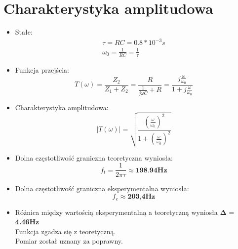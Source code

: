 \section{Charakterystyka amplitudowa}
    \begin{itemize}
        \item Stałe:
            \begin{gather}
                \tau = RC = 0.8 * 10^{-3}s \\
                \omega_0 = \frac{1}{RC} = \frac{1}{\tau}
            \end{gather}
        \item Funkcja przejścia:
            \begin{equation}
                T(\omega) = \frac{Z_2}{Z_1+Z_2} = \frac{R}{\frac{1}{j \omega C}+R} = \frac{j\frac{\omega}{\omega_0}}{1 + j \frac{\omega}{\omega_0}}
                \label{eqn:f_przejscia}
            \end{equation}
        \item Charakterystyka amplitudowa:
            \begin{equation}
                |T(\omega)| = \sqrt{\frac{(\frac{\omega}{\omega_0})^2}{1 + (\frac{\omega}{\omega_0})^2}}
                \label{eqn:char_amp}
            \end{equation}
        \item Dolna częstotliwość graniczna teoretyczna wyniosła:
            \begin{equation}
                f_t = \frac{1}{2 \pi \tau} \approx \textbf{198.94Hz}
            \end{equation}
        \item Dolna częstotliwość graniczna eksperymentalna wyniosła:
            \begin{equation}
                f_e \approx \textbf{203,4Hz}
            \end{equation}
        \item Różnica między wartością eksperymentalną a teoretyczną wyniosła $\boldsymbol{\Delta}$ = \textbf{4.46Hz} \\
            Funkcja zgadza się z teoretyczną. \\
            Pomiar został uznany za poprawny.
        \begin{figure}[H]
            \centering

\end{figure}
\end{itemize}
